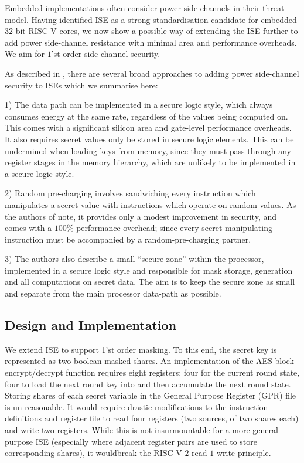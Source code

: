 
Embedded implementations often consider power side-channels in their threat
model.
Having identified ISE  as a strong standardisation candidate
for embedded $32$-bit RISC-V cores, we now show a possible
way of extending the ISE further to add power side-channel resistance
with minimal area and performance overheads.
We aim for $1$'st order side-channel security.

As described in \cite{TilGro:07}, there are several broad approaches
to adding power side-channel security to ISEs which we summarise here:

1) The data path can be implemented in a secure logic style, which always
consumes energy at the same rate, regardless of the values being computed on.
This comes with a significant silicon area and gate-level performance
overheads.
It also requires secret values only be stored in secure logic
elements.
This can be undermined when loading keys from memory, since they must
pass through any register stages in the memory hierarchy, which are
unlikely to be implemented in a secure logic style.

2) Random pre-charging involves sandwiching every instruction which
manipulates a secret value with instructions which operate on random values.
As the authors of \cite{TilGro:07} note, it provides only a modest
improvement in security, and comes with a $100\%$ performance overhead;
since every secret manipulating instruction must be accompanied by
a random-pre-charging partner.

3) The authors also describe a small ``secure zone'' within the processor,
implemented in a secure logic style and responsible for
mask storage, generation and all computations on secret data.
The aim is to keep the secure zone as small and separate from the main
processor data-path as possible.

\subsection{Design and Implementation}

We extend ISE  to support 1'st order masking.
To this end, the secret key is represented as two boolean masked shares.
An implementation of the AES block encrypt/decrypt function requires
eight registers: four for the current round state, four to load the
next round key into and then accumulate the next round state.
Storing shares of each secret variable
in the General Purpose Register (GPR) file is un-reasonable.
It would require drastic modifications to the instruction definitions and
register file to read four registers (two sources, of two shares each) and
write two registers.
While this is not insurmountable for a more general purpose ISE
(especially where adjacent register pairs are used to store corresponding
shares),
it wouldbreak the RISC-V $2$-read-$1$-write principle.

